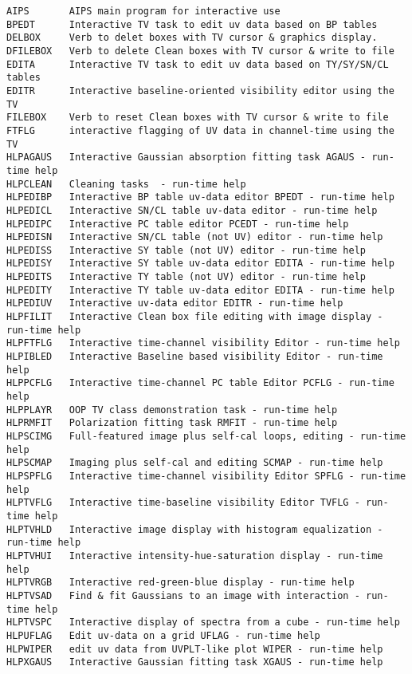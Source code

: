 \vskip 0.5pt
\bbve\begin{verbatim}
AIPS       AIPS main program for interactive use
BPEDT      Interactive TV task to edit uv data based on BP tables
DELBOX     Verb to delet boxes with TV cursor & graphics display.
DFILEBOX   Verb to delete Clean boxes with TV cursor & write to file
EDITA      Interactive TV task to edit uv data based on TY/SY/SN/CL tables
EDITR      Interactive baseline-oriented visibility editor using the TV
FILEBOX    Verb to reset Clean boxes with TV cursor & write to file
FTFLG      interactive flagging of UV data in channel-time using the TV
HLPAGAUS   Interactive Gaussian absorption fitting task AGAUS - run-time help
HLPCLEAN   Cleaning tasks  - run-time help
HLPEDIBP   Interactive BP table uv-data editor BPEDT - run-time help
HLPEDICL   Interactive SN/CL table uv-data editor - run-time help
HLPEDIPC   Interactive PC table editor PCEDT - run-time help
HLPEDISN   Interactive SN/CL table (not UV) editor - run-time help
HLPEDISS   Interactive SY table (not UV) editor - run-time help
HLPEDISY   Interactive SY table uv-data editor EDITA - run-time help
HLPEDITS   Interactive TY table (not UV) editor - run-time help
HLPEDITY   Interactive TY table uv-data editor EDITA - run-time help
HLPEDIUV   Interactive uv-data editor EDITR - run-time help
HLPFILIT   Interactive Clean box file editing with image display - run-time help
HLPFTFLG   Interactive time-channel visibility Editor - run-time help
HLPIBLED   Interactive Baseline based visibility Editor - run-time help
HLPPCFLG   Interactive time-channel PC table Editor PCFLG - run-time help
HLPPLAYR   OOP TV class demonstration task - run-time help
HLPRMFIT   Polarization fitting task RMFIT - run-time help
HLPSCIMG   Full-featured image plus self-cal loops, editing - run-time help
HLPSCMAP   Imaging plus self-cal and editing SCMAP - run-time help
HLPSPFLG   Interactive time-channel visibility Editor SPFLG - run-time help
HLPTVFLG   Interactive time-baseline visibility Editor TVFLG - run-time help
HLPTVHLD   Interactive image display with histogram equalization - run-time help
HLPTVHUI   Interactive intensity-hue-saturation display - run-time help
HLPTVRGB   Interactive red-green-blue display - run-time help
HLPTVSAD   Find & fit Gaussians to an image with interaction - run-time help
HLPTVSPC   Interactive display of spectra from a cube - run-time help
HLPUFLAG   Edit uv-data on a grid UFLAG - run-time help
HLPWIPER   edit uv data from UVPLT-like plot WIPER - run-time help
HLPXGAUS   Interactive Gaussian fitting task XGAUS - run-time help

\end{verbatim}
